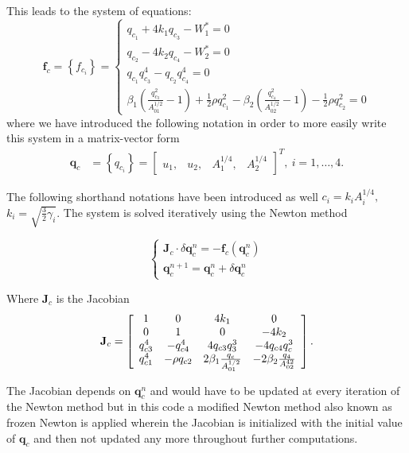 \documentclass[a4paper, oneside]{discothesis}
\begin{document}
	This leads to the system of equations:
	$$
	\mathbf{f}_c=\left\{f_{c_i}\right\}=\left\{\begin{array}{l}
			q_{c_1}+4 k_1 q_{c_3}-W_1^*=0 \\
			q_{c_2}-4 k_2 q_{c_4}-W_2^*=0 \\
			q_{c_1} q_{c_3}^4-q_{c_2} q_{c_4}^4=0 \\
			\beta_1\left(\frac{q_{c_3}^2}{A_{01}^{1 / 2}}-1\right)+\frac{1}{2} \rho q_{c_1}^2-\beta_2\left(\frac{q_{c_4}^2}{A_{02}^{1 / 2}}-1\right)-\frac{1}{2} \rho q_{c_2}^2=0
	\end{array}\right.
	$$
	where we have introduced the following notation in order to more easily write this system in a matrix-vector form
	$$
	\begin{aligned}
		\mathbf{q}_c&=\left\{q_{c_i}\right\}=\left[\begin{array}{llll}
				u_1, & u_2, & A_1^{1 / 4}, & A_2^{1 / 4}
		\end{array}\right]^T,\  i=1, \ldots, 4. 
			\end{aligned}
			$$

			The following shorthand notations have been introduced as well $c_i=k_i A_i^{1 / 4},$  $k_i=\sqrt{\frac{3}{2} \gamma_i}$.
			The system is solved iteratively using the Newton method

			$$
			\left\{\begin{array}{l}
					\mathbf{J}_c \cdot \delta \mathbf{q}_c^n=-\mathbf{f}_c\left(\mathbf{q}_c^n\right) \\
					\mathbf{q}_c^{n+1}=\mathbf{q}_c^n+\delta \mathbf{q}_c^n
			\end{array}\right.
			$$

			Where $\mathbf{J}_c$ is the Jacobian
$$\mathbf{J}_{c}=\left[\begin{array}{c c c c}{{{1}}}&{{0}}&{{{4}k_{1}}}&{{0}}\\ {{0}}&{{{1}}}&{{0}}&{{-4k_{2}}}\\ {{q_{c3}^{4}}}&{{-q_{c4}^{4}}}&{{4q_{c3}q_{3}^{3}}}&{{-4q_{c4}q_{c}^{3}}}\\ {{q_{c1}^{4}}}&{{-\rho q_{c2}}}&{{2\beta_{1}\frac{q_{c}}{A_{01}^{1/2}}}}&{{-2\beta_{2}\frac{q_{4}}{A_{02}^{42}}}}\end{array}\right].$$

The Jacobian depends on $\mathbf{q}_c^n$ and would have to be updated at every iteration of the Newton method but in this code a modified Newton method also known as frozen Newton is applied wherein the Jacobian is initialized with the initial value of $\mathbf{q}_c$ and then not updated any more throughout further computations.
\end{document}
